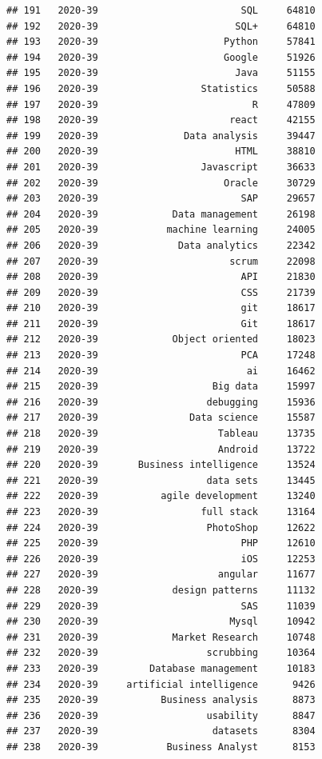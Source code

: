 \documentclass[
]{article}
\begin{document}
\begin{verbatim}
## 191   2020-39                         SQL     64810
## 192   2020-39                        SQL+     64810
## 193   2020-39                      Python     57841
## 194   2020-39                      Google     51926
## 195   2020-39                        Java     51155
## 196   2020-39                  Statistics     50588
## 197   2020-39                           R     47809
## 198   2020-39                       react     42155
## 199   2020-39               Data analysis     39447
## 200   2020-39                        HTML     38810
## 201   2020-39                  Javascript     36633
## 202   2020-39                      Oracle     30729
## 203   2020-39                         SAP     29657
## 204   2020-39             Data management     26198
## 205   2020-39            machine learning     24005
## 206   2020-39              Data analytics     22342
## 207   2020-39                       scrum     22098
## 208   2020-39                         API     21830
## 209   2020-39                         CSS     21739
## 210   2020-39                         git     18617
## 211   2020-39                         Git     18617
## 212   2020-39             Object oriented     18023
## 213   2020-39                         PCA     17248
## 214   2020-39                          ai     16462
## 215   2020-39                    Big data     15997
## 216   2020-39                   debugging     15936
## 217   2020-39                Data science     15587
## 218   2020-39                     Tableau     13735
## 219   2020-39                     Android     13722
## 220   2020-39       Business intelligence     13524
## 221   2020-39                   data sets     13445
## 222   2020-39           agile development     13240
## 223   2020-39                  full stack     13164
## 224   2020-39                   PhotoShop     12622
## 225   2020-39                         PHP     12610
## 226   2020-39                         iOS     12253
## 227   2020-39                     angular     11677
## 228   2020-39             design patterns     11132
## 229   2020-39                         SAS     11039
## 230   2020-39                       Mysql     10942
## 231   2020-39             Market Research     10748
## 232   2020-39                   scrubbing     10364
## 233   2020-39         Database management     10183
## 234   2020-39     artificial intelligence      9426
## 235   2020-39           Business analysis      8873
## 236   2020-39                   usability      8847
## 237   2020-39                    datasets      8304
## 238   2020-39            Business Analyst      8153

\end{verbatim}
\end{document}
